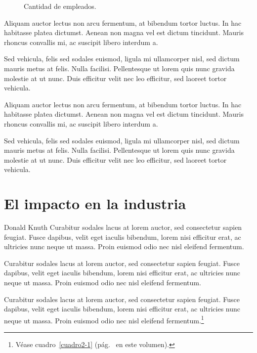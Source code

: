 \ifHTMLEPUB
\begin{figure}[h]
\centering
\begin{bchart}[step=200,max=1000]
\end{bchart}
\caption{Cantidad de empleados.}
\end{figure}
\fi

Aliquam auctor lectus non arcu fermentum, at bibendum tortor luctus. In hac habitasse platea dictumst. Aenean non magna vel est dictum tincidunt. Mauris rhoncus convallis mi, ac suscipit libero interdum a.

Sed vehicula, felis sed sodales euismod, ligula mi ullamcorper nisl, sed dictum mauris metus at felis. Nulla facilisi. Pellentesque ut lorem quis nunc gravida molestie at ut nunc. Duis efficitur velit nec leo efficitur, sed laoreet tortor vehicula.

Aliquam auctor lectus non arcu fermentum, at bibendum tortor luctus. In hac habitasse platea dictumst. Aenean non magna vel est dictum tincidunt. Mauris rhoncus convallis mi, ac suscipit libero interdum a.

Sed vehicula, felis sed sodales euismod, ligula mi ullamcorper nisl, sed dictum mauris metus at felis. Nulla facilisi. Pellentesque ut lorem quis nunc gravida molestie at ut nunc. Duis efficitur velit nec leo efficitur, sed laoreet tortor vehicula.

\section{El impacto en la industria}

Donald Knuth Curabitur sodales lacus at lorem auctor, sed consectetur sapien feugiat. Fusce dapibus, velit eget iaculis bibendum, lorem nisi efficitur erat, ac ultricies nunc neque ut massa. Proin euismod odio nec nisl eleifend fermentum.

Curabitur sodales lacus at lorem auctor, sed consectetur sapien feugiat. Fusce dapibus, velit eget iaculis bibendum, lorem nisi efficitur erat, ac ultricies nunc neque ut massa. Proin euismod odio nec nisl eleifend fermentum.

Curabitur sodales lacus at lorem auctor, sed consectetur sapien feugiat. Fusce dapibus, velit eget iaculis bibendum, lorem nisi efficitur erat, ac ultricies nunc neque ut massa. Proin euismod odio nec nisl eleifend fermentum.\footnote{Véase cuadro~\ref{cuadro2-1} (pág.~\pageref{cuadro2-1} en este volumen).}

